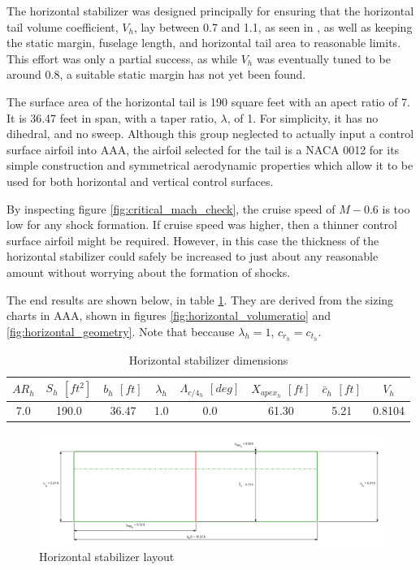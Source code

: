 \documentclass[conf]{new-aiaa}
\begin{document}
The horizontal stabilizer was designed principally for ensuring that the 
horizontal tail volume coefficient, $V_h$, lay between 0.7 and 1.1, as seen 
in \cite{orange_book}, as well as keeping the static margin, fuselage length, 
and horizontal tail area to reasonable limits. This effort was only a 
partial success, as while $V_h$ was eventually tuned to be around 0.8, a 
suitable static margin has not yet been found. 

The surface area of the horizontal tail is 190 square feet with an apect 
ratio of 7. It is 36.47 feet in span, with a taper ratio, $\lambda$, of 1. 
For simplicity, it has no dihedral, and no sweep. Although this group 
neglected to actually input a control surface airfoil into AAA, the airfoil 
selected for the tail is a NACA 0012 for its simple construction and 
symmetrical aerodynamic properties which allow it to be used for both 
horizontal and vertical control surfaces.

By inspecting figure \ref{fig:critical_mach_check}, the cruise speed of 
$M-0.6$ is too low for any shock formation. If cruise speed was higher, 
then a thinner control surface airfoil might be required. However, in this 
case the thickness of the horizontal stabilizer could safely be increased to 
just about any reasonable amount without worrying about the formation of shocks.

The end results are shown below, in table 
\ref{tab:horizontal_stabilizer_size}. They are derived from the sizing 
charts in AAA, shown in figures \ref{fig:horizontal_volumeratio} and 
\ref{fig:horizontal_geometry}. Note that beccause $\lambda_h = 1$,
$c_{r_h} = c_{t_h}$.

\begin{table}[H]
\centering
\caption{Horizontal stabilizer dimensions}
\begin{tabular}{|c|c|c|c|c|c|c|c|}\hline
    $AR_h$ & $S_h$ $[ft^2]$ & $b_h$ $[ft]$ & $\lambda_h$ & $\Lambda_{c/4_h}$ $[deg]$ & $X_{apex_h}$ $[ft]$ & $\bar{c}_h$ $[ft]$ & $V_h$  \\ \hline
    7.0 & 190.0 & 36.47 & 1.0 & 0.0 & 61.30 & 5.21 & 0.8104 \\ \hline
\end{tabular}
\label{tab:horizontal_stabilizer_size}
\end{table}

\begin{figure}[H]
    \includegraphics[width=\textwidth]{Report3Printouts/Empannage/Horizontal_geometry_plot.png}
    \caption{Horizontal stabilizer layout}
    \label{fig:horizontal_geometry_plot}
\end{figure}
\end{document}
